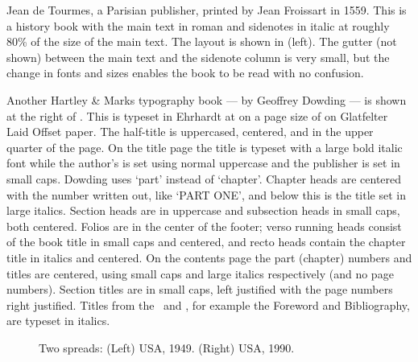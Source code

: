 \documentclass[10pt,a4paper,extrafontsizes]{memoir}
\begin{document}
\begin{paracol}{2}
\switchEng
   Jean de Tourmes, a Parisian publisher, 
printed 
by Jean Froissart in 1559. This is a history book with the main text in
roman and sidenotes in italic at roughly 80\% of the size of the main text.
The layout is shown in  (left). The gutter (not shown) between 
the main text and the sidenote column 
is very small, 
but the change in fonts and sizes enables the book to be read with no 
confusion. 


Another Hartley \& Marks
typography book ---  by Geoffrey Dowding --- 
is shown at the right of .
This is typeset in Ehrhardt at  on a page 
size of  on Glatfelter Laid 
Offset paper. 
The half-title is uppercased,
centered, and in the upper quarter of the page. On the title 
page the title is typeset with a large bold italic font 
while the author's is set using normal uppercase and the publisher
is set in small caps. Dowding uses `part' instead of `chapter'. 
Chapter heads are centered with the number written 
out, like `PART ONE', and below this is the title set in large italics.
Section heads are in uppercase and subsection heads in 
small caps, both centered. Folios are in the center of the 
footer; verso running heads
consist of the book title in small caps and centered, and recto heads
contain the chapter title in italics and centered. On the 
contents page the part (chapter) numbers and titles
are centered, using small caps and large italics respectively (and no page
numbers). Section titles are in small caps, left justified with the
page numbers right justified. Titles from the \pixfrontmatter\ 
and \pixbackmatter, for example the Foreword and 
Bibliography, are typeset in italics.
\end{paracol}


\begin{figure}
\centering
\begin{minipage}[b]{\pwlayi}
\end{minipage}
\hfill
\begin{minipage}[b]{\pwlayi}
\end{minipage}
\caption[Two spreads: USA, 1949 and 1990]%
        {Two spreads: (Left) USA, 1949.
         (Right) USA, 1990.} \label{fb:4}
\end{figure}
\end{document}
